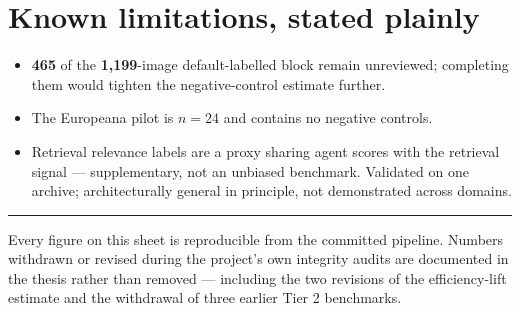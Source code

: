 \documentclass[10pt,a4paper]{article}
\newcommand{\num}[1]{\textbf{#1}}
\begin{document}
\section{Known limitations, stated plainly}
\begin{itemize}
  \item \num{465} of the \num{1{,}199}-image default-labelled block remain unreviewed; completing them would tighten the negative-control estimate further.
  \item The Europeana pilot is $n{=}24$ and contains no negative controls.
  \item Retrieval relevance labels are a proxy sharing agent scores with the retrieval signal --- supplementary, not an unbiased benchmark. Validated on one archive; architecturally general in principle, not demonstrated across domains.
\end{itemize}

\vfill
\rule{\textwidth}{0.4pt}
{\footnotesize\color{PrismGray} Every figure on this sheet is reproducible from the committed pipeline. Numbers withdrawn or revised during the project's own integrity audits are documented in the thesis rather than removed --- including the two revisions of the efficiency-lift estimate and the withdrawal of three earlier Tier 2 benchmarks.}
\end{document}
